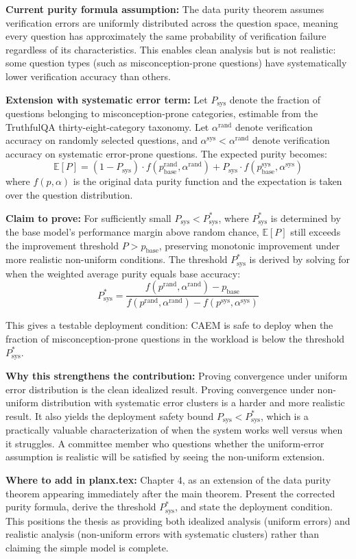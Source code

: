 \documentclass[11pt,a4paper]{article}
\newcommand{\theorybox}[2]{%
\begin{tcolorbox}[enhanced,breakable,
  colback=LightForest,colframe=ForestGreen,boxrule=1.5pt,arc=4pt,
  left=8pt,right=8pt,top=6pt,bottom=6pt,
  title={\bfseries\small\color{white}#1},
  attach boxed title to top left={yshift=-2mm,xshift=6mm},
  boxed title style={colback=ForestGreen,arc=3pt,boxrule=0pt,
    left=4pt,right=4pt,top=2pt,bottom=2pt}]
#2
\end{tcolorbox}}
\begin{document}
\theorybox{THEORY UPDATE 4: Non-Uniform Error Distribution Extension}{
\textbf{Current purity formula assumption:} The data purity theorem assumes verification errors are uniformly distributed across the question space, meaning every question has approximately the same probability of verification failure regardless of its characteristics. This enables clean analysis but is not realistic: some question types (such as misconception-prone questions) have systematically lower verification accuracy than others.

\textbf{Extension with systematic error term:} Let $P_{\text{sys}}$ denote the fraction of questions belonging to misconception-prone categories, estimable from the TruthfulQA thirty-eight-category taxonomy. Let $\alpha^{\text{rand}}$ denote verification accuracy on randomly selected questions, and $\alpha^{\text{sys}} < \alpha^{\text{rand}}$ denote verification accuracy on systematic error-prone questions. The expected purity becomes:
\[
\mathbb{E}[P] = (1 - P_{\text{sys}}) \cdot f(p_{\text{base}}^{\text{rand}}, \alpha^{\text{rand}})
+ P_{\text{sys}} \cdot f(p_{\text{base}}^{\text{sys}}, \alpha^{\text{sys}})
\]
where $f(p, \alpha)$ is the original data purity function and the expectation is taken over the question distribution.

\textbf{Claim to prove:} For sufficiently small $P_{\text{sys}} < P_{\text{sys}}^*$, where $P_{\text{sys}}^*$ is determined by the base model's performance margin above random chance, $\mathbb{E}[P]$ still exceeds the improvement threshold $P > p_{\text{base}}$, preserving monotonic improvement under more realistic non-uniform conditions. The threshold $P_{\text{sys}}^*$ is derived by solving for when the weighted average purity equals base accuracy:
\[
P_{\text{sys}}^* = \frac{f(p^{\text{rand}}, \alpha^{\text{rand}}) - p_{\text{base}}}{f(p^{\text{rand}}, \alpha^{\text{rand}}) - f(p^{\text{sys}}, \alpha^{\text{sys}})}
\]

This gives a testable deployment condition: CAEM is safe to deploy when the fraction of misconception-prone questions in the workload is below the threshold $P_{\text{sys}}^*$.

\textbf{Why this strengthens the contribution:} Proving convergence under uniform error distribution is the clean idealized result. Proving convergence under non-uniform distribution with systematic error clusters is a harder and more realistic result. It also yields the deployment safety bound $P_{\text{sys}} < P_{\text{sys}}^*$, which is a practically valuable characterization of when the system works well versus when it struggles. A committee member who questions whether the uniform-error assumption is realistic will be satisfied by seeing the non-uniform extension.

\textbf{Where to add in planx.tex:} Chapter 4, as an extension of the data purity theorem appearing immediately after the main theorem. Present the corrected purity formula, derive the threshold $P_{\text{sys}}^*$, and state the deployment condition. This positions the thesis as providing both idealized analysis (uniform errors) and realistic analysis (non-uniform errors with systematic clusters) rather than claiming the simple model is complete.
}
\end{document}
